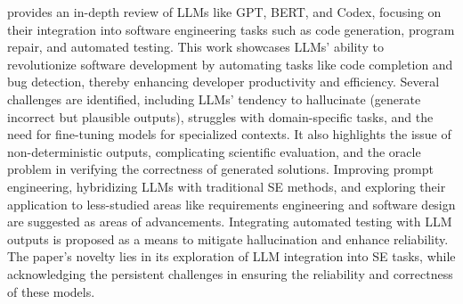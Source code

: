 \citet{fan2023large} provides an in-depth review of LLMs like GPT, BERT, and Codex, focusing on their integration into software engineering tasks such as code generation, program repair, and automated testing. This work showcases LLMs' ability to revolutionize software development by automating tasks like code completion and bug detection, thereby enhancing developer productivity and efficiency. Several challenges are identified, including LLMs' tendency to hallucinate (generate incorrect but plausible outputs), struggles with domain-specific tasks, and the need for fine-tuning models for specialized contexts. It also highlights the issue of non-deterministic outputs, complicating scientific evaluation, and the oracle problem in verifying the correctness of generated solutions. Improving prompt engineering, hybridizing LLMs with traditional SE methods, and exploring their application to less-studied areas like requirements engineering and software design are suggested as areas of advancements. Integrating automated testing with LLM outputs is proposed as a means to mitigate hallucination and enhance reliability. The paper’s novelty lies in its exploration of LLM integration into SE tasks, while acknowledging the persistent challenges in ensuring the reliability and correctness of these models.

